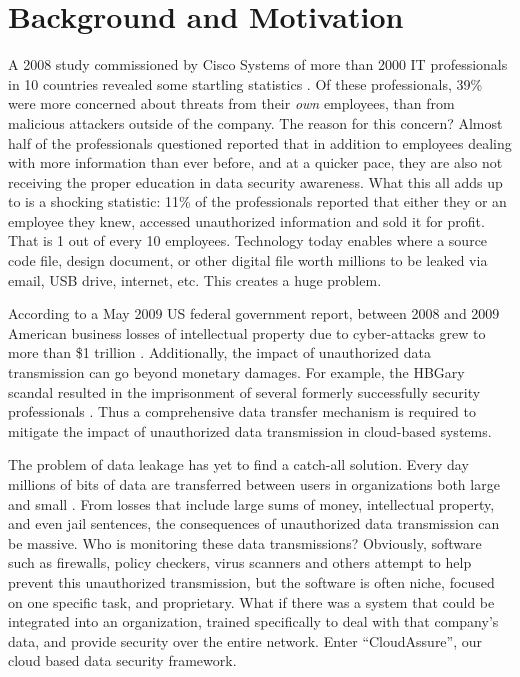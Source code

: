 






\section{Background and Motivation}
A 2008 study commissioned by Cisco Systems of more than 2000 IT professionals in
10 countries revealed some startling statistics \autocite{Cisco2008}. Of these professionals,
39\% were more concerned about threats from their \emph{own} employees, than from
malicious attackers outside of the company. The reason for this concern?
Almost half of the professionals questioned reported that in addition to
employees dealing with more information than ever before, and at a quicker
pace, they are also not receiving the proper education in data security
awareness. What this all adds up to is a shocking statistic: 11\% of the
professionals reported that either they or an employee they knew, accessed
unauthorized information and sold it for profit. That is 1 out of every 10
employees. Technology today enables where a source code file, design document, or other
digital file worth millions to be leaked via email, USB drive, internet,
etc. This creates a huge problem.  

According to a May 2009 US federal
government report, between 2008 and 2009 American business losses of intellectual
property due to
cyber-attacks grew to more than \$1 trillion \autocite{Symantec2013}. 
Additionally, the impact of unauthorized data
transmission can go beyond monetary damages. For example, the HBGary
scandal resulted in the
imprisonment of several formerly successfully security professionals
\autocite{Bright2012}.
Thus a comprehensive data transfer mechanism is required to mitigate the
impact of unauthorized data transmission in cloud-based systems.

The problem of data leakage has yet to find a catch-all solution. Every day
millions of bits of data are transferred between users in
organizations both large and small \autocite{Bright2012}. From losses that
include large sums of money, intellectual property, and even jail
sentences, the consequences of unauthorized data transmission can be massive.
Who is monitoring these data transmissions? Obviously,
software such as firewalls, policy checkers, virus scanners and others attempt to help
prevent this unauthorized transmission, but the software is often niche, focused
on one specific task, and proprietary. What if there was a system that could be
integrated into an organization, trained specifically to deal with that company's
data, and provide security over the entire network. Enter ``CloudAssure'', our
cloud based data security framework. 


